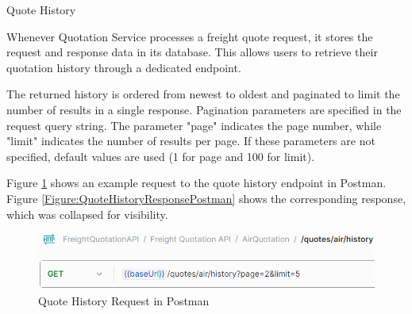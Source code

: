 \documentclass[12pt, reqno, oneside]{amsbook}
\makeatletter
\def\subsection{\@startsection{subsection}{2}%
      \z@{.5\linespacing\@plus.7\linespacing}{.25\linespacing}%
      {\normalfont\bfseries\flushleft}}
\theoremstyle{definition}
\theoremstyle{definition}
\numberwithin{section}{chapter}
\numberwithin{table}{chapter}
\numberwithin{figure}{chapter}
\makeatother
\begin{document}
\subsection{Quote History}
\label{Subsection:Quote_History}

Whenever Quotation Service processes a freight quote request, it stores the request and response data in its database. This allows users to retrieve their quotation history through a dedicated endpoint.

The returned history is ordered from newest to oldest and paginated to limit the number of results in a single response. Pagination parameters are specified in the request query string. The parameter "page" indicates the page number, while "limit" indicates the number of results per page. If these parameters are not specified, default values are used (1 for page and 100 for limit).

Figure \ref{Figure:QuoteHistoryRequestPostman} shows an example request to the quote history endpoint in Postman. Figure \ref{Figure:QuoteHistoryResponsePostman} shows the corresponding response, which was collapsed for visibility.

\begin{figure}[H]
  \centering
  \includegraphics[width=0.8\linewidth]{images/QuoteHistoryRequestPostman.png}
  \caption{\label{Figure:QuoteHistoryRequestPostman}Quote History Request in Postman}
\end{figure}
\end{document}
